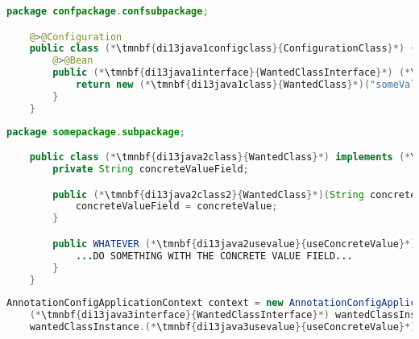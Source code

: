 \begin{lstlisting}[language=Java, title={Configuration class}]
    package confpackage.confsubpackage;

    @>@Configuration
    public class (*\tmnbf{di13java1configclass}{ConfigurationClass}*) {
        @>@Bean
        public (*\tmnbf{di13java1interface}{WantedClassInterface}*) (*\tmnbf{di13java1beanid}{wantedBeanMethod}*)() {
            return new (*\tmnbf{di13java1class}{WantedClass}*)("someValue");
        }
    }
\end{lstlisting}
\begin{lstlisting}[language=Java, title={Wanted class with the constructor}]
    package somepackage.subpackage;

    public class (*\tmnbf{di13java2class}{WantedClass}*) implements (*\tmnbf{di13java2interface}{WantedClassInterface}*) {
        private String concreteValueField;

        public (*\tmnbf{di13java2class2}{WantedClass}*)(String concreteValue) {
            concreteValueField = concreteValue;
        }

        public WHATEVER (*\tmnbf{di13java2usevalue}{useConcreteValue}*)() {
            ...DO SOMETHING WITH THE CONCRETE VALUE FIELD...
        }
    }
\end{lstlisting}
\begin{lstlisting}[language=Java, title={Usage}]
    AnnotationConfigApplicationContext context = new AnnotationConfigApplicationContext((*\tmnbf{di13java3configclass}{ConfigurationClass}*).class);
    (*\tmnbf{di13java3interface}{WantedClassInterface}*) wantedClassInstance = context.getBean("(*\tmnbf{di13java3beanid}{wantedBeanMethod}[ForestGreen]*)", (*\tmnbf{di13java3interface2}{WantedClassInterface}*).class);
    wantedClassInstance.(*\tmnbf{di13java3usevalue}{useConcreteValue}*)();
\end{lstlisting}
\newpage


